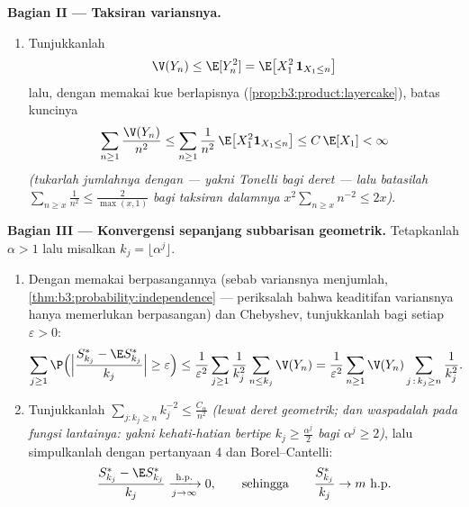 \begin{problem}
\medskip
\noindent\textbf{Bagian II --- Taksiran variansnya.}
\begin{enumerate}[resume]
  \item Tunjukkanlah
        \[
        \V(Y_n) \leq \E[Y_n^2] = \E\bigl[X_1^2\,\mathbf
        1_{X_1 \leq n}\bigr]
        \]
        lalu, dengan memakai kue berlapisnya
        (\cref{prop:b3:product:layercake}), batas kuncinya
        \[
        \sum_{n\geq1}\frac{\V(Y_n)}{n^2}
        \leq \sum_{n\geq1}\frac1{n^2}\,
        \E\bigl[X_1^2\mathbf 1_{X_1\leq n}\bigr]
        \leq C\,\E[X_1] < \infty
        \]
        \emph{(tukarlah jumlahnya dengan  ---
        yakni Tonelli bagi deret --- lalu batasilah $\sum_{n \geq
        x}\frac1{n^2} \leq \frac2{\max(x,1)}$ bagi taksiran
        dalamnya $x^2\sum_{n\geq x}n^{-2} \leq 2x$)}.
\end{enumerate}

\medskip
\noindent\textbf{Bagian III --- Konvergensi sepanjang subbarisan
geometrik.} Tetapkanlah $\alpha > 1$ lalu misalkan $k_j =
\lfloor\alpha^j\rfloor$.
\begin{enumerate}[resume]
  \item Dengan memakai  berpasangannya (sebab variansnya menjumlah,
        \cref{thm:b3:probability:independence} --- periksalah bahwa
        keaditifan variansnya hanya memerlukan 
        berpasangan) dan Chebyshev, tunjukkanlah bagi setiap
        $\varepsilon > 0$:
        \[
        \sum_{j\geq1}\P\Bigl(\Bigl|
        \frac{S^*_{k_j} - \E S^*_{k_j}}{k_j}\Bigr| \geq
        \varepsilon\Bigr)
        \leq
        \frac1{\varepsilon^2}\sum_{j\geq1}\frac1{k_j^2}
        \sum_{n\leq k_j}\V(Y_n)
        = \frac1{\varepsilon^2}\sum_{n\geq1}\V(Y_n)
        \sum_{j\,:\,k_j\geq n}\frac1{k_j^2} .
        \]
  \item Tunjukkanlah $\sum_{j : k_j \geq n}k_j^{-2} \leq
        \frac{C_\alpha}{n^2}$ \emph{(lewat deret geometrik;
        dan waspadalah pada fungsi lantainya: yakni kehati-hatian bertipe $k_j \geq \frac{\alpha^j}2$ bagi
        $\alpha^j \geq 2$)}, lalu simpulkanlah dengan
        pertanyaan 4 dan Borel--Cantelli:
        \[
        \frac{S^*_{k_j} - \E S^*_{k_j}}{k_j}
        \xrightarrow[j\to\infty]{\text{h.p.}} 0,
        \qquad\text{sehingga}\qquad
        \frac{S^*_{k_j}}{k_j} \to m \ \text{h.p.}
        \]
\end{enumerate}


\end{problem}
